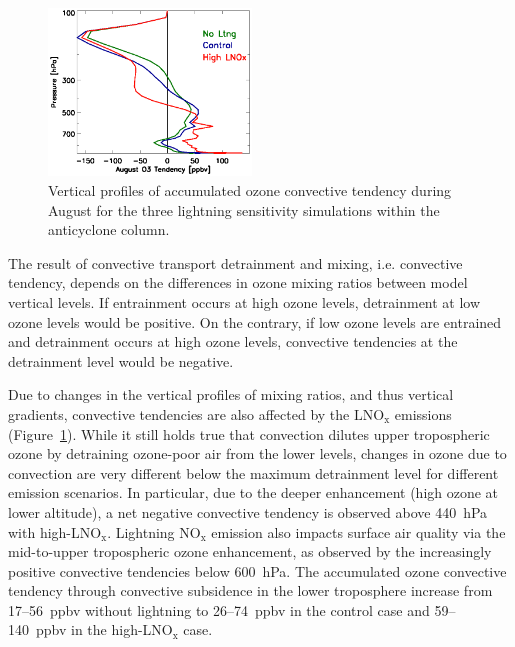 \begin{figure}
	\centering
	\begin{singlespacing}
	\vspace{-.4in}
	\includegraphics[width=0.48\textwidth]{Figures/ltngsens_o3conv.eps}
	\caption[Sensitivity of ozone convective tendency to ]{{\small
	Vertical profiles of accumulated ozone convective tendency during August for the three
	lightning sensitivity simulations within the anticyclone column.}}
	\label{fig:ltng_conv}
	\end{singlespacing}
\end{figure}

The result of convective transport detrainment and mixing, i.e. convective tendency, depends
on the differences in ozone mixing ratios between model vertical levels. If entrainment occurs
at high ozone levels, detrainment at low ozone levels would be positive. On the contrary,
if low ozone levels are entrained and detrainment occurs at high ozone levels, convective
tendencies at the detrainment level would be negative.

Due to changes in the vertical profiles of mixing ratios, and thus
vertical gradients, convective tendencies are also affected by the $\mathrm{LNO_x}$
emissions (Figure~\ref{fig:ltng_conv}). While it still holds true that convection
dilutes upper tropospheric ozone by detraining ozone-poor air from the
lower levels, changes in ozone due to convection are very different below
the maximum detrainment level for different emission scenarios. In
particular, due to the deeper enhancement (high ozone at lower altitude),
a net negative convective tendency is observed above 440~hPa with
high-LNO$_\mathrm{x}$. Lightning $\mathrm{NO_x}$ emission also impacts surface air quality
via the mid-to-upper tropospheric ozone enhancement, as observed by
the increasingly positive convective tendencies below 600~hPa. The accumulated
ozone convective tendency through convective subsidence in the lower troposphere
increase from 17--56~ppbv without lightning to 26--74~ppbv in the
control case and 59--140~ppbv in the high-LNO$_{\mathrm{x}}$ case.

